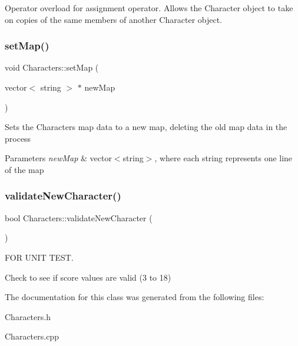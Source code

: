 Operator overload for assignment operator. Allows the Character object to take on copies of the same members of another Character object. \hypertarget{class_characters_a7ea2bd80b72476d35173691d31e80727}{}\label{class_characters_a7ea2bd80b72476d35173691d31e80727} 
\subsubsection{\texorpdfstring{set\+Map()}{setMap()}}
{\footnotesize\ttfamily void Characters\+::set\+Map (\begin{DoxyParamCaption}\item[{vector$<$ string $>$ $\ast$}]{new\+Map }\end{DoxyParamCaption})}

Sets the Character\textquotesingle{}s map data to a new map, deleting the old map data in the process 
\begin{DoxyParams}{Parameters}
{\em new\+Map} & vector$<$string$>$, where each string represents one line of the map \\
\hline
\end{DoxyParams}
\hypertarget{class_characters_a1273e2d7fe2e959cd3ed513c5717f6b7}{}\label{class_characters_a1273e2d7fe2e959cd3ed513c5717f6b7} 
\subsubsection{\texorpdfstring{validate\+New\+Character()}{validateNewCharacter()}}
{\footnotesize\ttfamily bool Characters\+::validate\+New\+Character (\begin{DoxyParamCaption}{ }\end{DoxyParamCaption})}



F\+OR U\+N\+IT T\+E\+ST. 

Check to see if score values are valid (3 to 18) 

The documentation for this class was generated from the following files\+:\begin{DoxyCompactItemize}
\item 
Characters.\+h\item 
Characters.\+cpp\end{DoxyCompactItemize}
